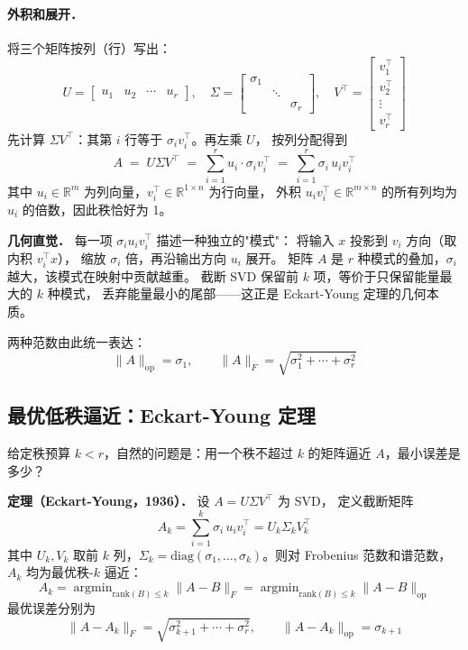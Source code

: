 \documentclass[12pt, a4paper]{article}
\newcommand{\op}{\mathrm{op}}
\begin{document}
\paragraph{外积和展开．}
将三个矩阵按列（行）写出：
\[
  U = \begin{bmatrix} u_1 & u_2 & \cdots & u_r \end{bmatrix},
  \quad
  \Sigma = \begin{bmatrix} \sigma_1 & & \\ & \ddots & \\ & & \sigma_r \end{bmatrix},
  \quad
  V^\top = \begin{bmatrix} v_1^\top \\ v_2^\top \\ \vdots \\ v_r^\top \end{bmatrix}
\]
先计算 $\Sigma V^\top$：其第 $i$ 行等于 $\sigma_i v_i^\top$。再左乘 $U$，
按列分配得到
\[
  A \;=\; U\Sigma V^\top
    \;=\; \sum_{i=1}^{r} u_i \cdot \sigma_i v_i^\top
    \;=\; \sum_{i=1}^{r} \sigma_i \, u_i v_i^\top
\]
其中 $u_i \in \mathbb{R}^m$ 为列向量，$v_i^\top \in \mathbb{R}^{1\times n}$ 为行向量，
外积 $u_i v_i^\top \in \mathbb{R}^{m \times n}$ 的所有列均为 $u_i$ 的倍数，因此秩恰好为 1。

\begin{rembox}
\textbf{几何直觉．}
每一项 $\sigma_i u_i v_i^\top$ 描述一种独立的"模式"：
将输入 $x$ 投影到 $v_i$ 方向（取内积 $v_i^\top x$），
缩放 $\sigma_i$ 倍，再沿输出方向 $u_i$ 展开。
矩阵 $A$ 是 $r$ 种模式的叠加，$\sigma_i$ 越大，该模式在映射中贡献越重。
截断 SVD 保留前 $k$ 项，等价于只保留能量最大的 $k$ 种模式，
丢弃能量最小的尾部——这正是 Eckart-Young 定理的几何本质。
\end{rembox}

两种范数由此统一表达：
\[
  \|A\|_{\op} = \sigma_1, \qquad \|A\|_F = \sqrt{\sigma_1^2 + \cdots + \sigma_r^2}
\]

\subsection{最优低秩逼近：Eckart-Young 定理}

给定秩预算 $k < r$，自然的问题是：用一个秩不超过 $k$ 的矩阵逼近 $A$，最小误差是多少？

\begin{defbox}
\textbf{定理（Eckart-Young，1936）．} 设 $A = U\Sigma V^\top$ 为 SVD，
定义截断矩阵
\[
  A_k = \sum_{i=1}^{k} \sigma_i \, u_i v_i^\top = U_k \Sigma_k V_k^\top
\]
其中 $U_k, V_k$ 取前 $k$ 列，$\Sigma_k = \mathrm{diag}(\sigma_1,\ldots,\sigma_k)$。则对
Frobenius 范数和谱范数，$A_k$ 均为最优秩-$k$ 逼近：
\[
  A_k = \mathop{\arg\min}_{\mathrm{rank}(B) \leq k} \|A - B\|_F
       = \mathop{\arg\min}_{\mathrm{rank}(B) \leq k} \|A - B\|_{\op}
\]
最优误差分别为
\[
  \|A - A_k\|_F = \sqrt{\sigma_{k+1}^2 + \cdots + \sigma_r^2}, \qquad
  \|A - A_k\|_{\op} = \sigma_{k+1}
\]
\end{defbox}
\end{document}
